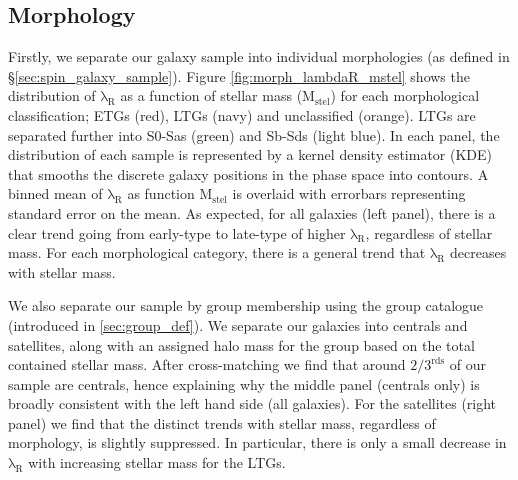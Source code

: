 \subsection{Morphology}
Firstly, we separate our galaxy sample into individual morphologies (as defined in \S\ref{sec:spin_galaxy_sample}). Figure \ref{fig:morph_lambdaR_mstel} shows the distribution of $\mathrm{\lambda_R}$ as a function of stellar mass ($\mathrm{M_{stel}}$) for each morphological classification; ETGs (red), LTGs (navy) and unclassified (orange). LTGs are separated further into S0-Sas (green) and Sb-Sds (light blue). In each panel, the distribution of each sample is represented by a kernel density estimator (KDE) that smooths the discrete galaxy positions in the phase space into contours. A binned mean of $\mathrm{\lambda_R}$ as function $\mathrm{M_{stel}}$ is overlaid with errorbars representing standard error on the mean. As expected, for all galaxies (left panel), there is a clear trend going from early-type to late-type of higher $\mathrm{\lambda_R}$, regardless of stellar mass. For each morphological category, there is a general trend that $\mathrm{\lambda_R}$ decreases with stellar mass. 

We also separate our sample by group membership using the \citep{lim2017} group catalogue (introduced in \ref{sec:group_def}). We separate our galaxies into centrals and satellites, along with an assigned halo mass for the group based on the total contained stellar mass. After cross-matching we find that around $\mathrm{2/3^{rds}}$ of our sample are centrals, hence explaining why the middle panel (centrals only) is broadly consistent with the left hand side (all galaxies). For the satellites (right panel) we find that the distinct trends with stellar mass, regardless of morphology, is slightly suppressed. In particular, there is only a small decrease in $\mathrm{\lambda_R}$ with increasing stellar mass for the LTGs.

